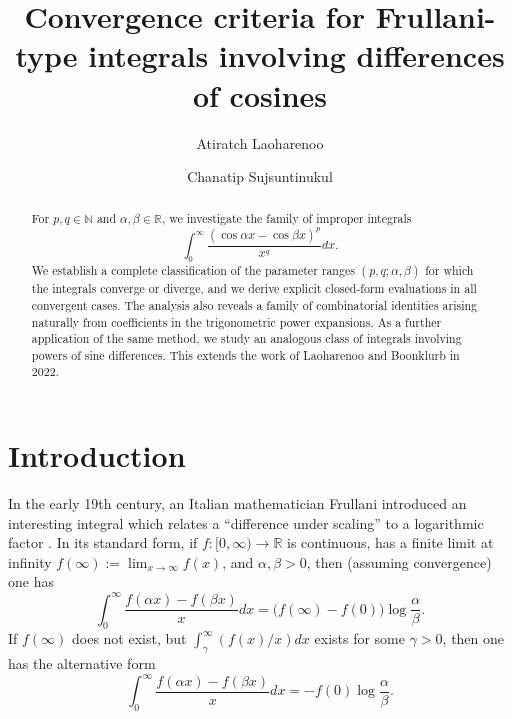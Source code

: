 \documentclass[12pt, reqno]{amsart}
\title[Frullani-type integrals involving cosines]{Convergence criteria for Frullani-type integrals involving differences of cosines}
\author{Atiratch Laoharenoo}
\author{Chanatip Sujsuntinukul}
\theoremstyle{plain}
\theoremstyle{definition}
\begin{document}
\maketitle


\begin{abstract}
For $p,q\in\mathbb{N}$ and $\alpha,\beta\in\mathbb{R}$, we investigate the family of improper integrals
 \[\int_0^\infty\frac{(\cos\alpha x-\cos\beta x)^p}{x^q}dx.\] 
We establish a complete classification of the parameter ranges $(p, q; \alpha, \beta)$ for which the integrals converge or diverge, and we derive explicit closed-form evaluations in all convergent cases. The analysis also reveals a family of combinatorial identities arising naturally from  coefficients in the trigonometric power expansions. As a further application of the same method, we study an analogous class of integrals involving powers of sine differences. This extends the work of Laoharenoo and Boonklurb in 2022.
\end{abstract}





\section{Introduction}

In the early 19th century, an Italian mathematician Frullani introduced an interesting integral which relates a ``difference under scaling'' to a logarithmic factor \cite{AR}. In its standard form, if $f:[0,\infty)\to\mathbb{R}$ is continuous, has a finite limit at infinity $f(\infty):=\lim_{x\to\infty}f(x)$, and $\alpha, \beta>0$, then (assuming convergence) one has
\[
\int_{0}^{\infty}\frac{f(\alpha x)-f(\beta x)}{x}dx=\bigl(f(\infty)-f(0)\bigr)\log\frac{\alpha}{\beta}.
\]
If $f(\infty)$ does not exist, but $\int_{\gamma}^{\infty}(f(x)/x)dx$ exists for some $\gamma>0$, then one has the alternative form
\[
\int_{0}^{\infty}\frac{f(\alpha x)-f(\beta x)}{x}dx=-f(0)\log\frac{\alpha}{\beta}.
\]
\end{document}
